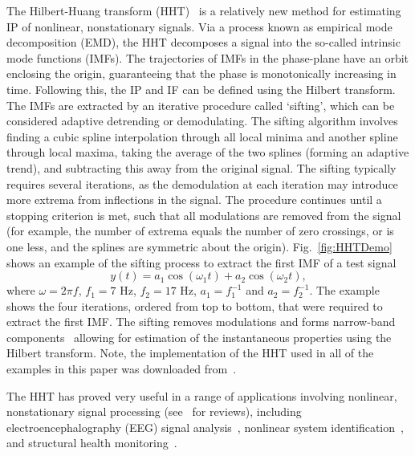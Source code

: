 \documentclass[a4paper]{IEEEtran}
\begin{document}
The Hilbert-Huang transform (HHT)~\cite{Huang1998} is a relatively new method for estimating IP of nonlinear, nonstationary signals. Via a process known as empirical mode decomposition (EMD), the HHT decomposes a signal into the so-called intrinsic mode functions (IMFs). The trajectories of IMFs in the phase-plane have an orbit enclosing the origin, guaranteeing that the phase is monotonically increasing in time. Following this, the IP and IF can be defined using the Hilbert transform. The IMFs are extracted by an iterative procedure called `sifting', which can be considered adaptive detrending or demodulating. The sifting algorithm involves finding a cubic spline interpolation through all local minima and another spline through local maxima, taking the average of the two splines (forming an adaptive trend), and subtracting this away from the original signal. The sifting typically requires several iterations, as the demodulation at each iteration may introduce more extrema from inflections in the signal. The procedure continues until a stopping criterion is met, such that all modulations are removed from the signal (for example, the number of extrema equals the number of zero crossings, or is one less, and the splines are symmetric about the origin). Fig.~\ref{fig:HHTDemo} shows an example of the sifting process to extract the first IMF of a test signal
\begin{equation}\label{eq:FirstTestSig}
y\left( t \right) = a_1\cos \left(\omega_1t\right) + a_2\cos \left( \omega _2t \right),
\end{equation}
where $\omega = 2\pi f$, $f_1 = 7$ Hz, $f_2 = 17$ Hz, $a_1 = f_1^{-1}$ and $a_2=f_2^{-1}$. The example shows the four iterations, ordered from top to bottom, that were required to extract the first IMF. The sifting removes modulations and forms narrow-band components~\cite{Huang1998} allowing for estimation of the instantaneous properties using the Hilbert transform. Note, the implementation of the HHT used in all of the examples in this paper was downloaded from~\cite{Wu2009}. 

The HHT has proved very useful in a range of applications involving nonlinear, nonstationary signal processing (see~\cite{Huang2008,Huang2005a} for reviews), including electroencephalography (EEG) signal analysis~\cite{Wang2008}, nonlinear system identification~\cite{Huang2005b}, and structural health monitoring~\cite{Pai2008}.
\end{document}
